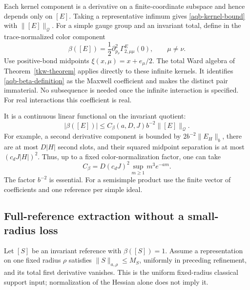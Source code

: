 \documentclass[11pt]{article}
\theoremstyle{remark}
\begin{document}
Each kernel component is a derivative on a finite-coordinate
subspace and hence depends only on $[E]$. Taking a representative
infimum gives \eqref{aqb-kernel-bound} with $\|[E]\|_{\mathcal Q}$.
For a simple gauge group and an invariant total, define in the
trace-normalized color component
\begin{equation}
 \beta([E])=\frac12\partial_{p_\nu}^2
                       \Gamma^E_{2,\mu\mu}(0),
 \qquad \mu\ne\nu.
 \label{aqb-beta-definition}
\end{equation}
Use positive-bond midpoints $\xi(x,\mu)=x+e_\mu/2$.
The total Ward algebra of Theorem~\ref{tkw-theorem} applies
directly to these infinite kernels. It identifies
\eqref{aqb-beta-definition} as the Maxwell coefficient and makes
the distinct pair immaterial. No subsequence is needed once
the infinite interaction is specified. For real interactions
this coefficient is real.

It is a continuous linear functional on the invariant quotient:
\begin{equation}
 |\beta([E])|\le C_\beta(a,D,J)b^{-2}
                                      \|[E]\|_{\mathcal Q}.
 \label{aqb-beta-bound}
\end{equation}
For example, a second derivative component is bounded by
$2b^{-2}\|E_H\|_b$, there are at most $D|H|$ second slots,
and their squared midpoint separation is at most
$(c_dJ|H|)^2$. Thus, up to a fixed color-normalization factor,
one can take
\begin{equation}
 C_\beta=D(c_dJ)^2\sup_{m\ge1}m^3e^{-am}.
 \label{aqb-beta-constant}
\end{equation}
The factor $b^{-2}$ is essential. For a semisimple product use
the finite vector of coefficients and one reference per simple
ideal.

\subsection{Full-reference extraction without a small-radius loss}
\label{aqb-extraction-section}

Let $[S]$ be an invariant reference with $\beta([S])=1$.
Assume a representation on one fixed radius $\rho$ satisfies
$\|S\|_{a,\rho}\le M_S$, uniformly in preceding refinement,
and its total first derivative vanishes. This is the uniform
fixed-radius classical support input; normalization of the
Hessian alone does not imply it.
\end{document}
